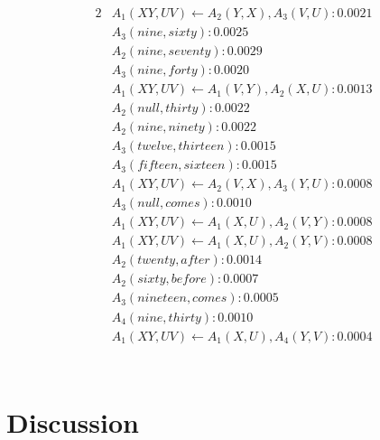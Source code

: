 \documentclass[11pt, twocolumn]{article}
\begin{document}
\begin{alignat*}{2}
&A_1(X Y, U V) \leftarrow A_2(Y, X), A_3(V, U) : 0.0021 \\
&A_3(nine, sixty) : 0.0025 \\
&A_2(nine, seventy) : 0.0029 \\
&A_3(nine, forty) : 0.0020 \\
&A_1(X Y, U V) \leftarrow A_1(V, Y), A_2(X, U) : 0.0013 \\
&A_2(null, thirty) : 0.0022 \\
&A_2(nine, ninety) : 0.0022 \\
&A_3(twelve, thirteen) : 0.0015 \\
&A_3(fifteen, sixteen) : 0.0015 \\
&A_1(X Y, U V) \leftarrow A_2(V, X), A_3(Y, U) : 0.0008 \\
&A_3(null, comes) : 0.0010 \\
&A_1(X Y, U V) \leftarrow A_1(X, U), A_2(V, Y) : 0.0008 \\
&A_1(X Y, U V) \leftarrow A_1(X, U), A_2(Y, V) : 0.0008 \\
&A_2(twenty, after) : 0.0014 \\
&A_2(sixty, before) : 0.0007 \\
&A_3(nineteen, comes) : 0.0005 \\
&A_4(nine, thirty) : 0.0010 \\
&A_1(X Y, U V) \leftarrow A_1(X, U), A_4(Y, V) : 0.0004 \\
\end{alignat*} \\
\section{Discussion}





\nocite{*}
\end{document}
